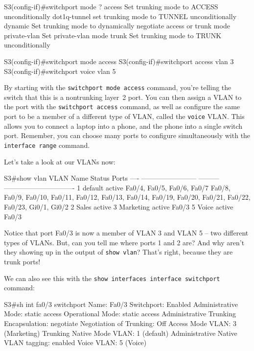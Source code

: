 \begin{cli}
S3(config-if)#switchport mode ?
  access        Set trunking mode to ACCESS unconditionally
  dot1q-tunnel  set trunking mode to TUNNEL unconditionally
  dynamic       Set trunking mode to dynamically negotiate access or trunk mode
  private-vlan  Set private-vlan mode
  trunk         Set trunking mode to TRUNK unconditionally

S3(config-if)#switchport mode access
S3(config-if)#switchport access vlan 3
S3(config-if)#switchport voice vlan 5
\end{cli}

By starting with the \texttt{switchport\ mode\ access} command, you're
telling the switch that this is a nontrunking layer~2 port. You can then
assign a VLAN to the port with the \texttt{switchport\ access} command,
as well as configure the same port to be a member of a different type of
VLAN, called the \texttt{voice} VLAN. This allows you to connect a
laptop into a phone, and the phone into a single switch port. Remember,
you can choose many ports to configure simultaneously with the
\texttt{interface\ range} command.

Let's take a look at our VLANs now:

\begin{cli}
S3#show vlan
VLAN Name                       Status    Ports
---- ------------------------ --------- -------------------------------
1    default                   active     Fa0/4, Fa0/5, Fa0/6, Fa0/7
                                          Fa0/8, Fa0/9, Fa0/10, Fa0/11,
                                          Fa0/12, Fa0/13, Fa0/14, Fa0/19,
                                          Fa0/20, Fa0/21, Fa0/22, Fa0/23,
                                          Gi0/1, Gi0/2
2    Sales                     active
3    Marketing                 active    Fa0/3
5    Voice                     active    Fa0/3
\end{cli}

Notice that port Fa0/3 is now a member of VLAN 3 and VLAN 5 -- two different types of VLANs.
But, can you tell me where ports 1 and 2 are?
And why aren't they showing up in the output of \texttt{show\ vlan}?
That's right, because they are trunk ports!

We can also see this with the
\texttt{show\ interfaces\ interface\ switchport} command:

\begin{cli}
S3#sh int fa0/3 switchport
Name: Fa0/3
Switchport: Enabled
Administrative Mode: static access
Operational Mode: static access
Administrative Trunking Encapsulation: negotiate
Negotiation of Trunking: Off
Access Mode VLAN: 3 (Marketing)
Trunking Native Mode VLAN: 1 (default)
Administrative Native VLAN tagging: enabled
Voice VLAN: 5 (Voice)
\end{cli}


